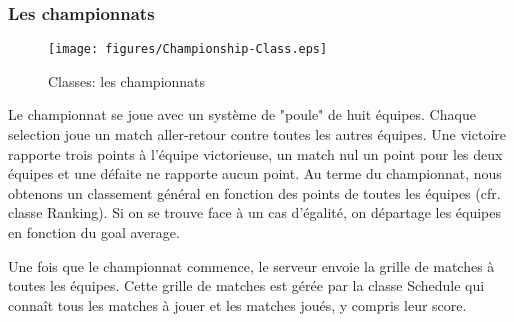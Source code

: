 \subsubsection{Les championnats}
\begin{figure}[h!]
  \centering
  \texttt{[image: figures/Championship-Class.eps]}
  \caption{\label{fig:Class:Championship} Classes: les championnats}
\end{figure}
Le championnat se joue avec un système de "poule" de huit équipes. Chaque 
\gls{selection} joue un 
match aller-retour contre toutes les autres équipes. Une victoire rapporte 
trois 
points à l'équipe victorieuse, un match nul un point pour les deux équipes et une défaite 
ne rapporte aucun point. Au terme du championnat, nous obtenons un classement général
en fonction des points de toutes les équipes (cfr. classe Ranking). Si on se trouve face
à un cas d'égalité, on départage les équipes en fonction du goal average. 


Une fois que le championnat commence, le serveur envoie la grille de matches à toutes 
les équipes. Cette grille de matches est gérée par la classe Schedule qui connaît tous les
matches à jouer et les matches joués, y compris leur score.




